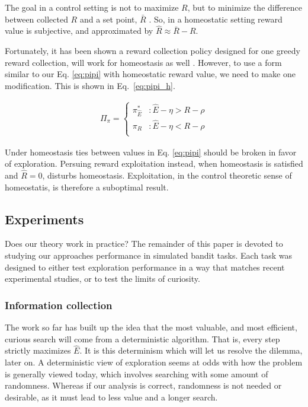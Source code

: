 The goal in a control setting is not to maximize $R$, but to minimize the difference between collected $R$ and a set point, $\bar R$ \cite{Keramati2014,Juechems2019,Munch2020}. So, in a homeostatic setting reward value is subjective, and approximated by $\hat R \approx \bar R - R$.

Fortunately, it has been shown a reward collection policy designed for one greedy reward collection, will work for homeostasis as well \cite{Keramati2014}. However, to use a form similar to our Eq. \ref{eq:pipi} with homeostatic reward value, we need to make one modification. This is shown in Eq.~\ref{eq:pipi_h}. 

\begin{equation} 
    \label{eq:pipi_h}
    \begin{split}
        \Pi_{\pi} = 
        \begin{cases}
            \pi^*_{\hat{E}} & : \hat{E} - \eta > R - \rho \\
            \pi_R 	& : \hat{E} - \eta < R - \rho \\
        \end{cases}
    \end{split}
\end{equation}

Under homeostasis ties between values in Eq. \ref{eq:pipi} should be broken in favor of exploration. Persuing reward exploitation instead, when homeostasis is satisfied and $\hat R=0$, disturbs homeostasis. Exploitation, in the control theoretic sense of homeostatis, is therefore a suboptimal result. 

\subsection*{Experiments}
Does our theory work in practice? The remainder of this paper is devoted to studying our approaches performance in simulated bandit tasks. Each task was designed to either test exploration performance in a way that matches recent experimental studies, or to test the limits of curiosity. 

\subsubsection*{Information collection}
The work so far has built up the idea that the most valuable, and most efficient, curious search will come from a deterministic algorithm. That is, every step strictly maximizes $\hat E$. It is this determinism which will let us resolve the dilemma, later on. A deterministic view of exploration seems at odds with how the problem is generally viewed today, which involves searching with some amount of randomness. Whereas if our analysis is correct, randomness is not needed or desirable, as it must lead to less value and a longer search. 

